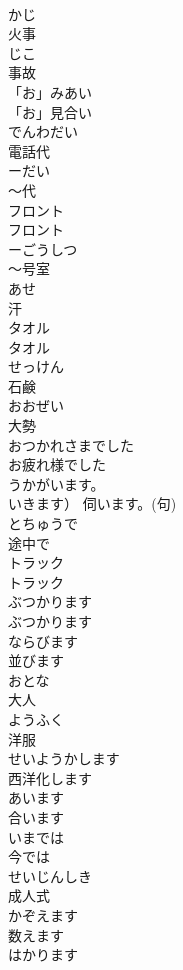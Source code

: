 \documentclass[8pt]{extreport}
\begin{document}
\begin{CJK}{UTF8}{min}
\\	かじ	
\\	火事		
\\	じこ	
\\	事故	
\\	「お」みあい	
\\	「お」見合い		
\\	でんわだい	
\\	電話代		
\\	ーだい	
\\	〜代		
\\	フロント	
\\	フロント		
\\	ーごうしつ	
\\	〜号室		
\\	あせ	
\\	汗		
\\	タオル	
\\	タオル		
\\	せっけん	
\\	石鹸		
\\	おおぜい	
\\	大勢	
\\	おつかれさまでした	
\\	お疲れ様でした	
\\	うかがいます。
\\	いきます）	伺います。(句)	
\\	とちゅうで	
\\	途中で		
\\	トラック	
\\	トラック		
\\	ぶつかります	
\\	ぶつかります		
\\	ならびます	
\\	並びます		
\\	おとな	
\\	大人		
\\	ようふく	
\\	洋服		
\\	せいようかします	
\\	西洋化します		
\\	あいます	
\\	合います		
\\	いまでは	
\\	今では		
\\	せいじんしき	
\\	成人式		
\\	かぞえます	
\\	数えます	
\\	はかります	

\end{CJK}
\end{document}
